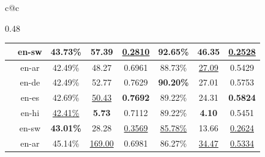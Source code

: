 \begin{table}[t!]
\begin{tabular}{c@{\hspace{1em}}c}
\begin{subtable}[c]{0.48\textwidth}
{\begin{tabular}{ccccc|ccc}
          & \cellcolor[HTML]{DDF6D2}\textsf{en}-\textsf{sw} & \cellcolor[HTML]{DDF6D2}43.73\% & \cellcolor[HTML]{DDF6D2}57.39 & \cellcolor[HTML]{DDF6D2}\underline{0.2810} & \cellcolor[HTML]{DDF6D2}92.65\% & \cellcolor[HTML]{DDF6D2}46.35 & \cellcolor[HTML]{DDF6D2}\underline{0.2528}\\

            \midrule

          \multirow{5}{*}{\rotatebox[origin=c]{90}{\scriptsize{\lm{Gemma3-27B}}}}
          & \cellcolor[HTML]{E5CCFF}\textsf{en}-\textsf{ar} & \cellcolor[HTML]{E5CCFF}42.49\% & \cellcolor[HTML]{E5CCFF}48.27 & \cellcolor[HTML]{E5CCFF}0.6961 & \cellcolor[HTML]{E5CCFF}88.73\% & \cellcolor[HTML]{E5CCFF}\underline{27.09} & \cellcolor[HTML]{E5CCFF}0.5429 \\
          & \cellcolor[HTML]{E0E6FF}\textsf{en}-\textsf{de} & \cellcolor[HTML]{E0E6FF}42.49\% & \cellcolor[HTML]{E0E6FF}52.77 & \cellcolor[HTML]{E0E6FF}0.7629 & \cellcolor[HTML]{E0E6FF}\textbf{90.20\%} & \cellcolor[HTML]{E0E6FF}27.01 & \cellcolor[HTML]{E0E6FF}0.5753  \\
          & \cellcolor[HTML]{FFF1D5}\textsf{en}-\textsf{es} & \cellcolor[HTML]{FFF1D5}42.69\% & \cellcolor[HTML]{FFF1D5}\underline{50.43} & \cellcolor[HTML]{FFF1D5}\textbf{0.7692} & \cellcolor[HTML]{FFF1D5}89.22\% & \cellcolor[HTML]{FFF1D5}24.31 & \cellcolor[HTML]{FFF1D5}\textbf{0.5824}\\

          & \cellcolor[HTML]{F2CFC2}\textsf{en}-\textsf{hi} & \cellcolor[HTML]{F2CFC2}\underline{42.41\%} & \cellcolor[HTML]{F2CFC2}\textbf{5.73} & \cellcolor[HTML]{F2CFC2}0.7112 & \cellcolor[HTML]{F2CFC2}89.22\% & \cellcolor[HTML]{F2CFC2}\textbf{4.10} & \cellcolor[HTML]{F2CFC2}0.5451\\

          & \cellcolor[HTML]{DDF6D2}\textsf{en}-\textsf{sw} & \cellcolor[HTML]{DDF6D2}\textbf{43.01\%} & \cellcolor[HTML]{DDF6D2}28.28 &  \cellcolor[HTML]{DDF6D2}\underline{0.3569} & \cellcolor[HTML]{DDF6D2}\underline{85.78\%} & \cellcolor[HTML]{DDF6D2}13.66 & \cellcolor[HTML]{DDF6D2}\underline{0.2624}\\



            \midrule

          \multirow{5}{*}{\rotatebox[origin=c]{90}{\scriptsize{\lm{Llama3.3-70B}}}}
          & \cellcolor[HTML]{E5CCFF}\textsf{en}-\textsf{ar} & \cellcolor[HTML]{E5CCFF}45.14\% & \cellcolor[HTML]{E5CCFF}\underline{169.00} & \cellcolor[HTML]{E5CCFF}0.6981 & \cellcolor[HTML]{E5CCFF}86.27\% & \cellcolor[HTML]{E5CCFF}\underline{34.47} & \cellcolor[HTML]{E5CCFF}\underline{0.5334} \\


\end{tabular}}
\end{subtable}
\end{tabular}
\end{table}
